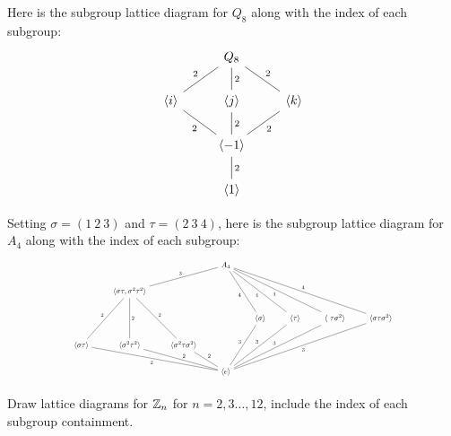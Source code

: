 \documentclass{ximera}
\begin{document}
\begin{example}
  Here is the subgroup lattice diagram for $Q_8$ along with the index
  of each subgroup:
  \[
  \begin{tikzcd}
    & Q_8 \ar[rd,-,"2"] \ar[d,-,"2"] \ar[ld,-,"2",swap] &       \\
    \<i\>  \ar[rd,-,"2",swap] & \<j\>  \ar[d,-,"2"]     & \<k\> \ar[ld,-,"2"]\\
    &\< -1\> \ar[d,-,"2"]&        \\   
    & \<1\> &
  \end{tikzcd}
  \]
\end{example}




\begin{example}
  Setting $\sigma = (1 \ 2 \ 3)$ and $\tau = (2 \ 3 \ 4)$, here is the
  subgroup lattice diagram for $A_4$ along with the index
  of each subgroup:
  \[
  \begin{tikzpicture}
  \node[scale=.6] at (0,0) {\begin{tikzcd}
                   &   & & A_4   \ar[lld,-,"3",swap] \ar[rdd,-,"4",swap] \ar[rrdd,-,"4",swap]  \ar[rrrdd,-,"4",swap]  \ar[rrrrdd,-,"4"]   & &  & &        \\
                   & \<\sigma\tau, \sigma^2\tau^2\> \ar[ldd,-,"2",swap] \ar[dd,-,"2"] \ar[rdd,-,"2"] &  &              & &  & &  \\
                   &                                  &            &   & \<\sigma\> \ar[ldd,-,"3",swap]& \<\tau\> \ar[lldd,-,"3",swap] & \<\ \tau\sigma^2\> \ar[llldd,-,"3",swap]& \< \sigma \tau\sigma^2 \>\ar[lllldd,-,"3"]       \\
   \<\sigma\tau\>\ar[drrr,-,"2",swap]  & \<\sigma^2\tau^2\> \ar[drr,-,"2"] & \<\sigma^2\tau\sigma^2\> \ar[dr,-,"2"]& & &  & &    \\
                   &                               &   & \< e\>       & & & &  
  \end{tikzcd}};
  \end{tikzpicture}
  \]
\end{example}




\begin{exercise}
  Draw lattice diagrams for $\mathbb Z_n$ for $n=2,3\dots, 12$, include the
  index of each subgroup containment.
\end{exercise}
\end{document}
